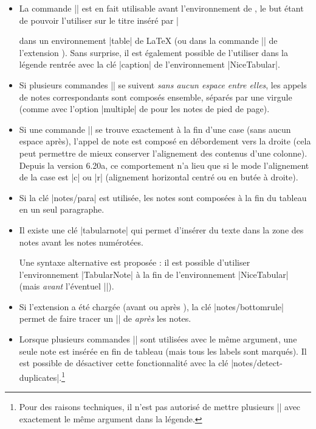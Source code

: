 \documentclass[dvipsnames]{article}%
\begin{document}
\medskip
\begin{itemize}
\item La commande |\tabularnote| est en fait utilisable avant
l'environnement de , le but étant de pouvoir l'utiliser sur le
titre inséré par |\caption| dans un environnement |{table}| de LaTeX (ou dans la
commande |\captionof| de l'extension ). Sans surprise, il est
également possible de l'utiliser dans la légende rentrée avec la clé |caption|
de l'environnement |{NiceTabular}|.

\item Si plusieurs commandes || se suivent \emph{sans aucun espace
  entre elles}, les appels de notes correspondants sont composés ensemble,
séparés par une virgule (comme avec l'option |multiple| de  pour
les notes de pied de page).

\item Si une commande || se trouve exactement à la fin d'une case
(sans aucun espace après), l'appel de note est composé en débordement vers la
droite (cela peut permettre de mieux conserver l'alignement des contenus d'une
colonne). Depuis la version 6.20a, ce comportement n'a lieu que si le mode
l'alignement de la case est |c| ou |r| (alignement horizontal centré ou en
butée à droite). 

\item Si la clé |notes/para| est utilisée, les notes sont composées à la fin du
tableau en un seul paragraphe.

\item {}
Il existe une clé |tabularnote| qui permet d'insérer du texte dans la zone
des notes avant les notes numérotées.


Une syntaxe alternative est proposée : il est possible d'utiliser
l'environnement |{TabularNote}| à la fin de l'environnement |{NiceTabular}|
(mais \emph{avant} l'éventuel |\CodeAfter|).

\item Si l'extension  a été chargée (avant ou après
), la clé |notes/bottomrule| permet de faire tracer un
|\bottomrule| de  \emph{après} les notes.

\item Lorsque plusieurs commandes |\tabularnote| sont utilisées avec le même
argument, une seule note est insérée en fin de tableau (mais tous les labels
sont marqués). Il est possible de désactiver cette fonctionnalité avec la clé
|notes/detect-duplicates|.\footnote{Pour des raisons techniques, il n'est pas
  autorisé de mettre plusieurs |\tabularnote| avec exactement le même argument
  dans la légende.}


\end{itemize}
\end{document}
